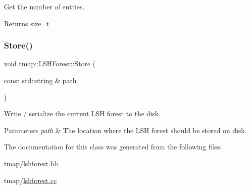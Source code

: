 Get the number of entries. 

\begin{DoxyReturn}{Returns}
size\+\_\+t 
\end{DoxyReturn}
\mbox{\label{classtmap_1_1LSHForest_a1731bf94cd09e7ebc4a10dd42145dc51}} 
\subsubsection{\texorpdfstring{Store()}{Store()}}
{\footnotesize\ttfamily void tmap\+::\+L\+S\+H\+Forest\+::\+Store (\begin{DoxyParamCaption}\item[{const std\+::string \&}]{path }\end{DoxyParamCaption})}



Write / serialize the current L\+SH forest to the disk. 


\begin{DoxyParams}{Parameters}
{\em path} & The location where the L\+SH forest should be stored on disk. \\
\hline
\end{DoxyParams}


The documentation for this class was generated from the following files\+:\begin{DoxyCompactItemize}
\item 
tmap/\hyperlink{lshforest_8hh}{lshforest.\+hh}\item 
tmap/\hyperlink{lshforest_8cc}{lshforest.\+cc}\end{DoxyCompactItemize}
